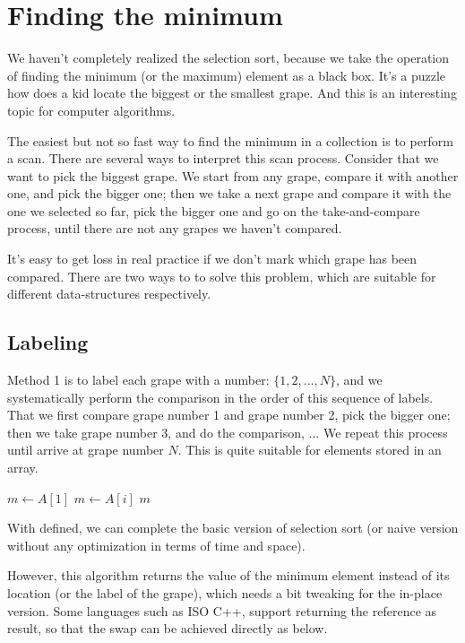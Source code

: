 \documentclass{article}
\begin{document}
\section{Finding the minimum}

We haven't completely realized the selection sort, because we take the operation
of finding the minimum (or the maximum) element as a black box. It's a puzzle how does
a kid locate the biggest or the smallest grape.
And this is an interesting topic for computer algorithms.

The easiest but not so fast way to find the minimum in a collection is to perform
a scan. There are several ways to interpret this scan process. Consider that
we want to pick the biggest grape. We start from any grape, compare it with
another one, and pick the bigger one; then we take a next grape and compare
it with the one we selected so far, pick the bigger one and go on the take-and-compare
process, until there are not any grapes we haven't compared.

It's easy to get loss in real practice if we don't mark which grape has been
compared. There are two ways to to solve this problem, which are suitable for
different data-structures respectively.

\subsection{Labeling}
Method 1 is to label each grape with a number: $\{1, 2, ..., N\}$, and we systematically
perform the comparison in the order of this sequence of labels. That we first
compare grape number 1 and grape number 2, pick the bigger one; then we take grape
number 3, and do the comparison, ... We repeat this process until arrive at
grape number $N$. This is quite suitable for elements stored in an array.

\begin{algorithmic}
  \State $m \gets A[1]$
      \State $m \gets A[i]$
    \EndIf
  \EndFor
  \State \Return $m$
\EndFunction
\end{algorithmic}

With  defined, we can complete the basic version of selection sort
(or naive version without any optimization in terms of time and space).

However, this algorithm returns the value of the minimum element instead of its
location (or the label of the grape), which needs a bit tweaking for the in-place version.
Some languages such as ISO C++, support returning the reference as result, so that the
swap can be achieved directly as below.
\end{document}
